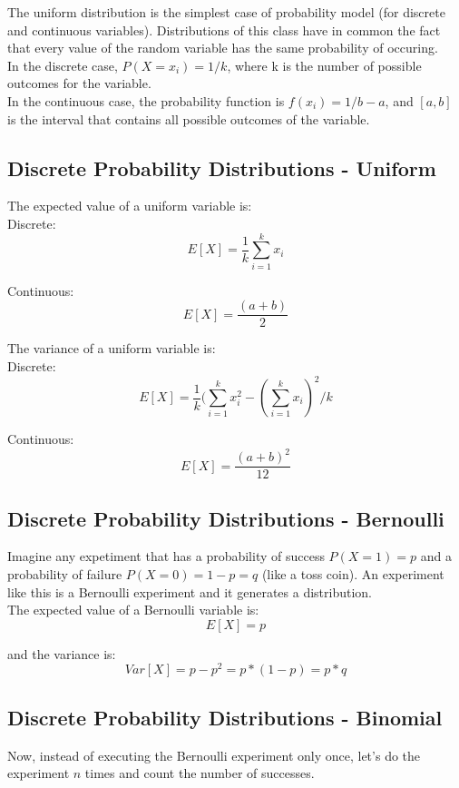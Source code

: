 \documentclass[11pt]{article}
\begin{document}
	The uniform distribution is the simplest case of probability model (for discrete and continuous variables). Distributions of this class have in common the fact that every value of the random variable has the same probability of occuring.\\
	
	In the discrete case, $P(X=x_i) = 1/k$, where k is the number of possible outcomes for the variable.\\

	In the continuous case, the probability function is $f(x_i) = 1/b-a$, and $[a,b]$ is the interval that contains all possible outcomes of the variable.

	\subsection*{Discrete Probability Distributions - Uniform}
	The expected value of a uniform variable is:\\

	Discrete:
	\[E[X] = \frac{1}{k} \sum\limits_{i=1}^k x_i\]

	Continuous:
	\[E[X] = \frac{(a+b)}{2} \]

	The variance of a uniform variable is:\\
	
	Discrete:
	\[E[X] = \frac{1}{k} (\sum\limits_{i=1}^k x_i^2-(\sum\limits_{i=1}^k x_i)^2/k\]

	Continuous:
	\[E[X] = \frac{(a+b)^2}{12} \]

	\subsection*{Discrete Probability Distributions - Bernoulli}
	Imagine any expetiment that has a probability of success $P(X=1) = p$ and a probability of failure $P(X=0) = 1-p = q$ (like a toss coin). An experiment like this is a Bernoulli experiment and it generates a distribution.\\

		The expected value of a Bernoulli variable is:
		\[E[X] = p\]

		and the variance is:
		\[Var[X]=p-p^2= p*(1-p) = p*q\]

	\subsection*{Discrete Probability Distributions - Binomial}
	
	Now, instead of executing the Bernoulli experiment only once, let's do the experiment $n$ times and count the number of successes.\\
\end{document}
